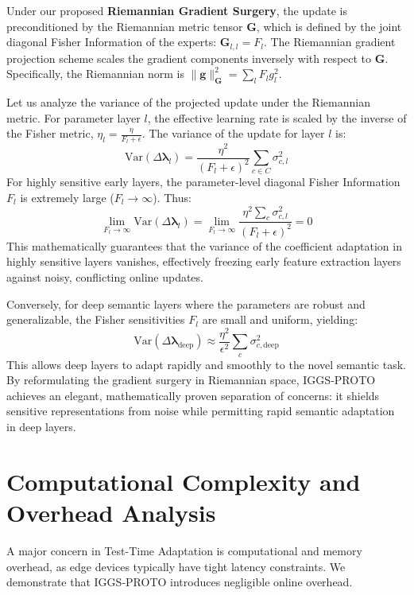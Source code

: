 \documentclass{article}
\theoremstyle{plain}
\theoremstyle{definition}
\theoremstyle{remark}
\begin{document}
Under our proposed \textbf{Riemannian Gradient Surgery}, the update is preconditioned by the Riemannian metric tensor $\mathbf{G}$, which is defined by the joint diagonal Fisher Information of the experts: $\mathbf{G}_{l,l} = F_l$. The Riemannian gradient projection scheme scales the gradient components inversely with respect to $\mathbf{G}$. Specifically, the Riemannian norm is $\|\mathbf{g}\|_{\mathbf{G}}^2 = \sum_l F_l g_l^2$.

Let us analyze the variance of the projected update under the Riemannian metric. For parameter layer $l$, the effective learning rate is scaled by the inverse of the Fisher metric, $\eta_l = \frac{\eta}{F_l + \epsilon}$. The variance of the update for layer $l$ is:
\begin{equation}
    \text{Var}(\Delta \boldsymbol{\lambda}_l) = \frac{\eta^2}{(F_l + \epsilon)^2} \sum_{c \in C} \sigma_{c,l}^2
\end{equation}
For highly sensitive early layers, the parameter-level diagonal Fisher Information $F_l$ is extremely large ($F_l \to \infty$). Thus:
\begin{equation}
    \lim_{F_l \to \infty} \text{Var}(\Delta \boldsymbol{\lambda}_l) = \lim_{F_l \to \infty} \frac{\eta^2 \sum_{c} \sigma_{c,l}^2}{(F_l + \epsilon)^2} = 0
\end{equation}
This mathematically guarantees that the variance of the coefficient adaptation in highly sensitive layers vanishes, effectively freezing early feature extraction layers against noisy, conflicting online updates.

Conversely, for deep semantic layers where the parameters are robust and generalizable, the Fisher sensitivities $F_l$ are small and uniform, yielding:
\begin{equation}
    \text{Var}(\Delta \boldsymbol{\lambda}_{\text{deep}}) \approx \frac{\eta^2}{\epsilon^2} \sum_{c} \sigma_{c,\text{deep}}^2
\end{equation}
This allows deep layers to adapt rapidly and smoothly to the novel semantic task. By reformulating the gradient surgery in Riemannian space, IGGS-PROTO achieves an elegant, mathematically proven separation of concerns: it shields sensitive representations from noise while permitting rapid semantic adaptation in deep layers.

\section{Computational Complexity and Overhead Analysis}
\label{app-sec:complexity}
A major concern in Test-Time Adaptation is computational and memory overhead, as edge devices typically have tight latency constraints. We demonstrate that IGGS-PROTO introduces negligible online overhead.
\end{document}
